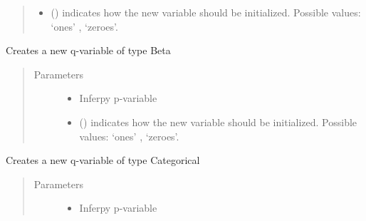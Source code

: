 \documentclass[letterpaper,10pt,english]{sphinxmanual}
\begin{document}
\begin{fulllineitems}
\begin{fulllineitems}
\begin{quote}
\begin{description}
\begin{itemize}
\item {} 
 () \textendash{} indicates how the new variable should be initialized. Possible values: ‘ones’ , ‘zeroes’.

\end{itemize}

\end{description}\end{quote}

\end{fulllineitems}


\begin{fulllineitems}
\label{\detokenize{modules/inferpy.inferences:inferpy.inferences.qmodel.Qmodel.Beta}}
Creates a new q-variable of type Beta
\begin{quote}\begin{description}
\item[{Parameters}] \leavevmode\begin{itemize}
\item {} 
 \textendash{} Inferpy p-variable

\item {} 
 () \textendash{} indicates how the new variable should be initialized. Possible values: ‘ones’ , ‘zeroes’.

\end{itemize}

\end{description}\end{quote}

\end{fulllineitems}


\begin{fulllineitems}
\label{\detokenize{modules/inferpy.inferences:inferpy.inferences.qmodel.Qmodel.Categorical}}
Creates a new q-variable of type Categorical
\begin{quote}\begin{description}
\item[{Parameters}] \leavevmode\begin{itemize}
\item {} 
 \textendash{} Inferpy p-variable


\end{itemize}
\end{description}
\end{quote}
\end{fulllineitems}
\end{fulllineitems}
\end{document}
